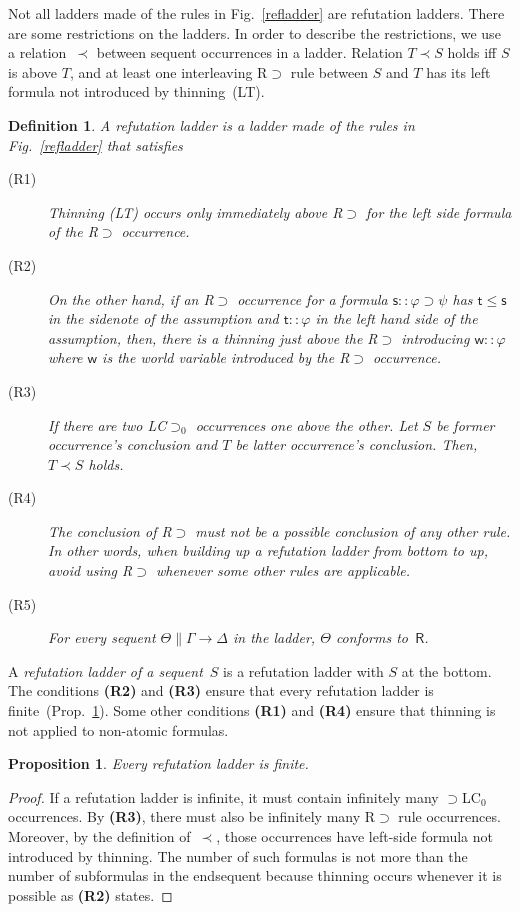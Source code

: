 \documentclass[doctor]{iscs-thesis}
\newtheorem{proposition}{Proposition}
\newtheorem{definition}{Definition}
\begin{document}
 Not all ladders made of the rules in Fig.~\ref{refladder} are
 refutation ladders.
 There are some restrictions on the ladders.
 In order to describe the restrictions,
 we use a relation~$\prec$ between sequent occurrences in a ladder.
Relation $T\prec S$ holds iff
 $S$ is above $T$, and
 at least one interleaving \textrm{R$\supset$} rule between $S$ and $T$
 has its left formula not introduced by thinning~(LT).
\begin{definition}
 A \textit{refutation ladder} is a ladder made of the rules in
 Fig.~\ref{refladder} that satisfies
\begin{description}
 \item[ (R1)] Thinning \textrm{(LT)} occurs only immediately above \textrm{R$\supset$} for the
	    left side formula of the \textrm{R$\supset$} occurrence.
 \item[ (R2)] 
	    On the other hand, if an \textrm{R$\supset$} occurrence
	    for a formula
	    $\mathsf s::\varphi\supset\psi$ has $\mathsf t\le \mathsf s$
	    in the sidenote of the assumption and
	    $\mathsf t::\varphi$ in the left hand side of the assumption,
	    then, 
	    there is a thinning just above the R$\supset$ introducing
	    $\mathsf w::\varphi$ where $\mathsf w$ is the world variable
	    introduced by the \textrm{R$\supset$} occurrence.
 \item[ (R3)]
	    If there are two \textrm{LC$\supset_0$} occurrences one above the
	    other.
	    Let $S$ be former occurrence's conclusion and $T$ be latter occurrence's
	    conclusion.
	    Then, $T\prec S$ holds.
 \item[ (R4)]
	    The conclusion of \textrm{R$\supset$} must not be a
	    possible conclusion of any other rule.
	    In other words, when building up a refutation ladder from
	    bottom to up, avoid using R$\supset$ whenever some other
	    rules are applicable.
 \item[ (R5)]
	    For every sequent $\Theta\parallel \Gamma\rightarrow\Delta$
	    in the ladder, $\Theta$ conforms to~$\mathsf R$.
\end{description} 
\end{definition}
A \textit{refutation ladder of a sequent}~$S$ is a refutation ladder
 with
 $S$ at the bottom.
The conditions \textbf{(R2)} and \textbf{(R3)} ensure that every
 refutation ladder is finite~(Prop.~\ref{refladder-finite}).
 Some other conditions \textbf{(R1)} and \textbf{(R4)} ensure
 that thinning is not applied to non-atomic formulas.


\begin{proposition}
\label{refladder-finite}
 Every refutation ladder is finite.
\end{proposition}
\begin{proof}
 If a refutation ladder is infinite,
 it must contain infinitely many $\supset$LC$_0$ occurrences.
 By \textbf{(R3)}, there must also be infinitely many R$\supset$ rule
 occurrences.
 Moreover, by the definition of~$\prec$,
 those occurrences have left-side formula not
 introduced by thinning.
 The number of such formulas is not more than the number of subformulas
 in the endsequent because thinning occurs whenever it is possible as
 \textbf{(R2)} states.
\end{proof}
\end{document}
